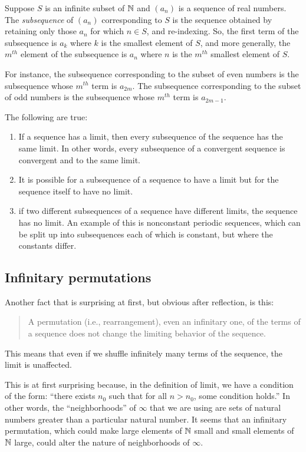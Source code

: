 \documentclass[10pt]{amsart}
\begin{document}
Suppose $S$ is an infinite subset of $\mathbb{N}$ and $(a_n)$ is a sequence of
real numbers. The {\em subsequence} of $(a_n)$ corresponding to $S$
is the sequence obtained by retaining only those $a_n$ for which $n
\in S$, and re-indexing. So, the first term of the subsequence is
$a_k$ where $k$ is the smallest element of $S$, and more generally,
the $m^{th}$ element of the subsequence is $a_n$ where $n$ is the
$m^{th}$ smallest element of $S$.

For instance, the subsequence corresponding to the subset of even
numbers is the subsequence whose $m^{th}$ term is $a_{2m}$. The
subsequence corresponding to the subset of odd numbers is the
subsequence whose $m^{th}$ term is $a_{2m - 1}$.

The following are true:

\begin{enumerate}
\item If a sequence has a limit, then every subsequence of the
  sequence has the same limit. In other words, every subsequence of a
  convergent sequence is convergent and to the same limit.
\item It is possible for a subsequence of a sequence to have a limit
  but for the sequence itself to have no limit.
\item if two different subsequences of a sequence have different
  limits, the sequence has no limit. An example of this is nonconstant
  periodic sequences, which can be split up into subsequences each of
  which is constant, but where the constants differ.
\end{enumerate}

\subsection{Infinitary permutations}

Another fact that is surprising at first, but obvious after
reflection, is this:

\begin{quote}
  A permutation (i.e., rearrangement), even an infinitary one, of the
  terms of a sequence does not change the limiting behavior of the
  sequence.
\end{quote}

This means that even if we shuffle infinitely many terms of the
sequence, the limit is unaffected.

This is at first surprising because, in the definition of limit, we
have a condition of the form: ``there exists $n_0$ such that for all
$n > n_0$, some condition holds.'' In other words, the
``neighborhoods'' of $\infty$ that we are using are sets of natural
numbers greater than a particular natural number. It seems that an
infinitary permutation, which could make large elements of $\mathbb{N}$ small
and small elements of $\mathbb{N}$ large, could alter the nature of
neighborhoods of $\infty$.
\end{document}
